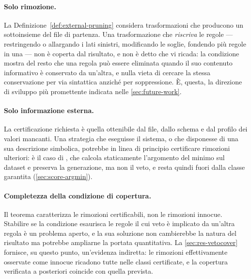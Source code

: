 \paragraph{Solo rimozione.} La Definizione~\ref{def:external-pruning} considera trasformazioni che
producono un sottoinsieme del file di partenza. Una trasformazione che \emph{riscriva} le regole
--- restringendo o allargando i lati sinistri, modificando le soglie, fondendo più regole in una
--- non è coperta dal risultato, e non è detto che vi ricada: la condizione \Vtwo{} mostra del
resto che una regola può essere eliminata quando il suo contenuto informativo è conservato da
un'altra, e nulla vieta di cercare la stessa conservazione per via sintattica anziché per
soppressione. È, questa, la direzione di sviluppo più promettente indicata nelle
\autoref{sec:future-work}.

\paragraph{Solo informazione esterna.} La certificazione richiesta è quella ottenibile dal file,
dallo schema e dal profilo dei valori mancanti. Una strategia che eseguisse il sistema, o che
disponesse di una sua descrizione simbolica, potrebbe in linea di principio certificare rimozioni
ulteriori: è il caso di , che calcola staticamente l'argomento del minimo sul
dataset e preserva la generazione, ma non il veto, e resta quindi fuori dalla classe garantita
(\autoref{sec:score-argmin}).

\paragraph{Completezza della condizione di copertura.} Il teorema caratterizza le rimozioni
certificabili, non le rimozioni innocue. Stabilire se la condizione \Vtwo{} esaurisca le regole il
cui veto è implicato da un'altra regola è un problema aperto, e la sua soluzione non cambierebbe
la natura del risultato ma potrebbe ampliarne la portata quantitativa. La
\autoref{sec:res-vetocover} fornisce, su questo punto, un'evidenza indiretta: le rimozioni
effettivamente osservate come innocue ricadono tutte nelle classi certificate, e la copertura
verificata a posteriori coincide con quella prevista.

